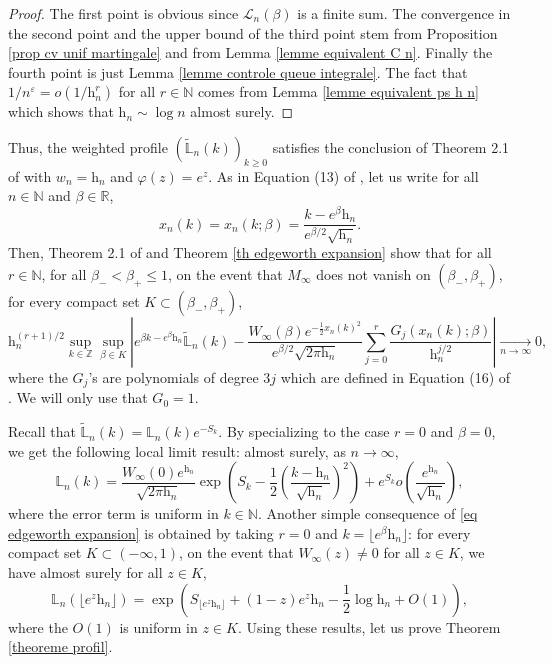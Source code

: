 \documentclass[11pt]{article}
\numberwithin{equation}{section}
\def\vp{\varepsilon}
\def \R{\mathbb {R}}
\def \N{\mathbb{N}}
\def \Z{\mathbb{Z}}
\def \cL{\mathcal{L}}
\begin{document}
\begin{proof}
	The first point is obvious since $\cL_n(\beta)$ is a finite sum. The convergence in the second point and the upper bound of the third point stem from Proposition \ref{prop cv unif martingale} and from Lemma \ref{lemme equivalent C n}. Finally the fourth point is just Lemma \ref{lemme controle queue integrale}. The fact that $1/n^\vp = o(1/\mathrm{h}_n^r)$ for all $r \in \N$ comes from Lemma \ref{lemme equivalent ps h n} which shows that $\mathrm{h}_n \sim \log n$ almost surely.
\end{proof}
Thus, the weighted profile $(\widetilde{\mathbb{L}}_n(k))_{k\ge 0}$ satisfies the conclusion of Theorem 2.1 of \cite{KMS17} with $w_n = \mathrm{h}_n$ and $\varphi(z)=e^z$. As in Equation (13) of \cite{KMS17}, let us write for all $n\in \N$ and $\beta \in \R$,
\[
x_n(k) =x_n(k;\beta)= \frac{k-e^\beta \mathrm{h}_n}{e^{\beta/2} \sqrt{\mathrm{h}_n}}.
\]
Then, Theorem 2.1 of \cite{KMS17} and Theorem \ref{th edgeworth expansion} show that for all $r \in \N$, for all $\beta_-< \beta_+ \le 1$, on the event that $M_\infty$ does not vanish on $(\beta_-, \beta_+)$, for every compact set $K \subset (\beta_-, \beta_+)$, 
\begin{equation}\label{eq edgeworth expansion}
	\mathrm{h}_n^{(r+1)/2}  \sup_{k \in \Z} \sup_{\beta \in K} \left\vert e^{\beta k - e^\beta \mathrm{h}_n} \widetilde{\mathbb{L}}_n(k) - \frac{W_\infty(\beta) e^{-\frac{1}{2} x_n(k)^2}}{e^{\beta/2}\sqrt{2\pi \mathrm{h}_n}} \sum_{j=0}^r \frac{G_j(x_n(k); \beta)}{\mathrm{h}_n^{j/2}} \right\vert\mathop{\longrightarrow}\limits_{n\to \infty}0,
\end{equation}
where the $G_j$'s are polynomials of degree $3j$ which are defined in Equation (16) of \cite{KMS17}. We will only use that $G_0=1$.

Recall that $\widetilde{\mathbb{L}}_n(k)=\mathbb{L}_n(k)e^{-S_k}$. By specializing to the case $r=0$ and $\beta=0$, we get the following local limit result: almost surely, as $n\to \infty$,
\begin{equation}\label{eq limite locale profil}
\mathbb{L}_n(k) = \frac{W_\infty(0)e^{\mathrm{h}_n}}{\sqrt{2\pi \mathrm{h}_n}} \exp\left(S_k- \frac{1}{2} \left(\frac{k-\mathrm{h}_n}{\sqrt{\mathrm{h}_n}}\right)^2 \right)  + e^{S_k}o\left(\frac{e^{\mathrm{h}_n}}{\sqrt{\mathrm{h}_n}} \right),
\end{equation}
where the error term is uniform in $k\in \N$. Another simple consequence of \eqref{eq edgeworth expansion} is obtained by taking $r=0$ and $k = \lfloor e^\beta \mathrm{h}_n\rfloor$: for every compact set $K \subset (-\infty,1)$, on the event that $W_\infty(z) \neq 0$ for all $z \in K$, we have almost surely for all $z \in K$,
\begin{equation}\label{eq limite profil h n}
\mathbb{L}_n(\lfloor e^z\mathrm{h}_n\rfloor) = \exp\left({S_{\lfloor e^z\mathrm{h}_n\rfloor} +  (1-z)e^z \mathrm{h}_n -\frac{1}{2} \log \mathrm{h}_n + O(1) }\right),
\end{equation}
where the $O(1)$ is uniform in $z \in K$. Using these results, let us prove Theorem \ref{theoreme profil}.
\end{document}
